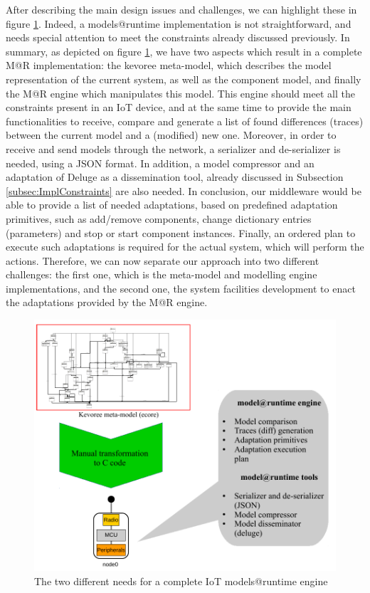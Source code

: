 After describing the main design issues and challenges, we can highlight these in figure \ref{fig:MAR_Challenges}.
Indeed, a models@runtime implementation is not straightforward, and needs special attention to meet the constraints already discussed previously.
In summary, as depicted on figure \ref{fig:MAR_Challenges}, we have two aspects which result in a complete M@R implementation: the kevoree meta-model, which describes the model representation of the current system, as well as the component model, and finally the M@R engine which manipulates this model.
This engine should meet all the constraints present in an IoT device, and at the same time to provide the main functionalities to receive, compare and generate a list of found differences (traces) between the current model and a (modified) new one.
Moreover, in order to receive and send models through the network, a serializer and de-serializer is needed, using a JSON format.
In addition, a model compressor and an adaptation of Deluge \cite{hui2004dynamic} as a dissemination tool, already discussed in Subsection \ref{subsec:ImplConstraints} are also needed.
In conclusion, our middleware would be able to provide a list of needed adaptations, based on predefined adaptation primitives, such as add/remove components, change dictionary entries (parameters) and stop or start component instances.
Finally, an ordered plan to execute such adaptations is required for the actual system, which will perform the actions.
Therefore, we can now separate our approach into two different challenges: the first one, which is the meta-model and modelling engine implementations, and the second one, the system facilities development to enact the adaptations provided by the M@R engine.

\begin{figure}[]
	\centering
	\includegraphics[width=0.85\columnwidth]{chapters/modelsAtRuntimeIoT.images/Challenges.pdf}
	\caption{The two different needs for a complete IoT models@runtime engine}
	\label{fig:MAR_Challenges}
\end{figure}

